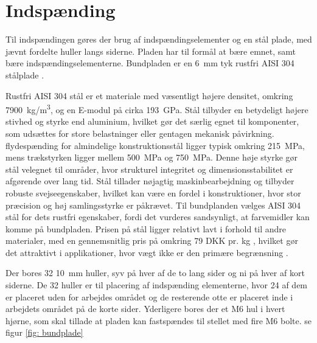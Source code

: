 \section{Indspænding} \label{Indspænding}

Til indspændingen gøres der brug af indspændingselementer og en stål plade, med jævnt fordelte huller langs siderne. Pladen har til formål at bære emnet, samt bære indspændingselementerne. Bundpladen er en \SI{6}{mm} tyk rustfri AISI 304 stålplade \parencite{Stalet2025KbMal}.

Rustfri AISI 304 stål er et materiale med væsentligt højere densitet, omkring \SI{7900}{kg/m^3}, og en E-modul på cirka \SI{193}{GPa}. Stål tilbyder en betydeligt højere stivhed og styrke end aluminium, hvilket gør det særlig egnet til komponenter, som udsættes for store belastninger eller gentagen mekanisk påvirkning. flydespænding for almindelige konstruktionsstål ligger typisk omkring \SI{215}{MPa}, mens trækstyrken ligger mellem \SI{500}{MPa} og \SI{750}{MPa}. Denne høje styrke gør stål velegnet til områder, hvor strukturel integritet og dimensionsstabilitet er afgørende over lang tid. Stål tillader nøjagtig maskinbearbejdning og tilbyder robuste svejseegenskaber, hvilket kan være en fordel i konstruktioner, hvor stor præcision og høj samlingsstyrke er påkrævet. Til bundplanden vælges AISI 304 stål for dets rustfri egenskaber, fordi det vurderes sandsynligt, at farvemidler kan komme på bundpladen. Prisen på stål ligger relativt lavt i forhold til andre materialer, med en gennemsnitlig pris på omkring 79 DKK pr. kg \parencite{Stalprofil}, hvilket gør det attraktivt i applikationer, hvor vægt ikke er den primære begrænsning \parencite{Jessen2011RustfritKorrosion}.


Der bores 32 \SI{10}{mm} huller, syv på hver af de to lang sider og ni på hver af kort siderne. De 32 huller er til placering af indspænding elementerne, hvor 24 af dem er placeret uden for arbejdes området og de resterende otte er placeret inde i arbejdets området på de korte sider. Yderligere bores der et M6 hul i hvert hjørne, som skal tillade at pladen kan fastspændes til stellet med fire M6 bolte. se figur \ref{fig: bundplade}


